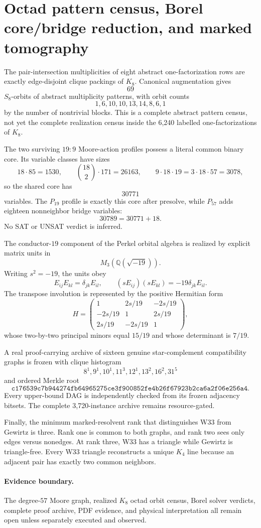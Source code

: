 \section{Octad pattern census, Borel core/bridge reduction, and marked tomography}
\label{sec:bt3628-3634}

The pair-intersection multiplicities of eight abstract one-factorization rows are exactly edge-disjoint clique packings of $K_8$.  Canonical augmentation gives
\[
\boxed{69}
\]
$S_8$-orbits of abstract multiplicity patterns, with orbit counts
\[
1,6,10,10,13,14,8,6,1
\]
by the number of nontrivial blocks.  This is a complete abstract pattern census, not yet the complete realization census inside the 6,240 labelled one-factorizations of $K_8$.

The two surviving $19{:}9$ Moore-action profiles possess a literal common binary core.  Its variable classes have sizes
\[
18\cdot85=1530,\qquad \binom{18}{2}\cdot171=26163,
\qquad 9\cdot18\cdot19=3\cdot18\cdot57=3078,
\]
so the shared core has
\[
\boxed{30771}
\]
variables.  The $P_{19}$ profile is exactly this core after presolve, while $P_{57}$ adds eighteen nonneighbor bridge variables:
\[
\boxed{30789=30771+18}.
\]
No SAT or UNSAT verdict is inferred.

The conductor-$19$ component of the Perkel orbital algebra is realized by explicit matrix units in
\[
M_3\!\left(\mathbb Q(\sqrt{-19})\right).
\]
Writing $s^2=-19$, the units obey
\[
E_{ij}E_{kl}=\delta_{jk}E_{il},
\qquad (sE_{ij})(sE_{kl})=-19\delta_{jk}E_{il}.
\]
The transpose involution is represented by the positive Hermitian form
\[
H=\begin{pmatrix}
1&2s/19&-2s/19\\
-2s/19&1&2s/19\\
2s/19&-2s/19&1
\end{pmatrix},
\]
whose two-by-two principal minors equal $15/19$ and whose determinant is $7/19$.

A real proof-carrying archive of sixteen genuine star-complement compatibility graphs is frozen with clique histogram
\[
8^1,9^1,10^1,11^3,12^1,13^2,16^2,31^5
\]
and ordered Merkle root
\[
\texttt{c176539c7b944274fb64965275ce3f900852fe4b26f67923b2ca6a2f06e256a4}.
\]
Every upper-bound DAG is independently checked from its frozen adjacency bitsets.  The complete 3,720-instance archive remains resource-gated.

Finally, the minimum marked-resolvent rank that distinguishes W33 from Gewirtz is three.  Rank one is common to both graphs, and rank two sees only edges versus nonedges.  At rank three, W33 has a triangle while Gewirtz is triangle-free.  Every W33 triangle reconstructs a unique $K_4$ line because an adjacent pair has exactly two common neighbors.

\paragraph{Evidence boundary.}
The degree-$57$ Moore graph, realized $K_8$ octad orbit census, Borel solver verdicts, complete proof archive, PDF evidence, and physical interpretation all remain open unless separately executed and observed.
